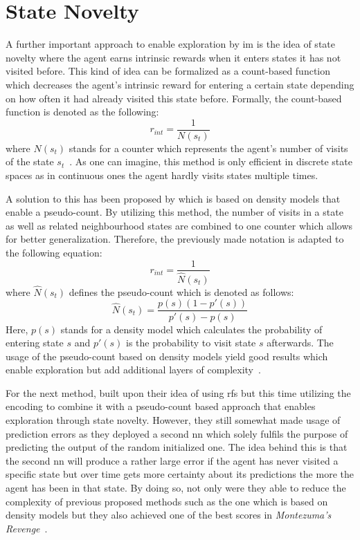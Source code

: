 \documentclass[draft,final]{vutinfth} %
\begin{document}
    \section{State Novelty}\label{sec:state-novelty}

    A further important approach to enable exploration by \gls{im} is the idea of state novelty where the agent earns intrinsic rewards when it enters states it has not visited before.
    This kind of idea can be formalized as a count-based function which decreases the agent's intrinsic reward for entering a certain state depending on how often it had already visited this state before.
    Formally, the count-based function is denoted as the following:
    \begin{equation}
        r_{int}=\frac{1}{N(s_t)}
    \end{equation}
    where $N(s_t)$ stands for a counter which represents the agent's number of visits of the state $s_t$~\citep{aubret_survey_2019}.
    As one can imagine, this method is only efficient in discrete state spaces as in continuous ones the agent hardly visits states multiple times.

    A solution to this has been proposed by \citeauthor{bellemare_unifying_2016} which is based on density models that enable a pseudo-count.
    By utilizing this method, the number of visits in a state as well as related neighbourhood states are combined to one counter which allows for better generalization.
    Therefore, the previously made notation is adapted to the following equation:
    \begin{equation}
        r_{int}=\frac{1}{\hat{N}(s_t)}
    \end{equation}
    where $\hat{N}(s_t)$ defines the pseudo-count which is denoted as follows:
    \begin{equation}
        \hat{N}(s_t)=\frac{p(s)(1-p'(s))}{p'(s)-p(s)}
    \end{equation}
    Here, $p(s)$ stands for a density model which calculates the probability of entering state $s$ and $p'(s)$ is the probability to visit state $s$ afterwards.
    The usage of the pseudo-count based on density models yield good results which enable exploration but add additional layers of complexity~\citep{aubret_survey_2019}.

    For the next method, \citet{burda_exploration_2018} built upon their idea of using \glspl{rf} but this time utilizing the encoding to combine it with a pseudo-count based approach that enables exploration through state novelty.
    However, they still somewhat made usage of prediction errors as they deployed a second \gls{nn} which solely fulfils the purpose of predicting the output of the random initialized one.
    The idea behind this is that the second \gls{nn} will produce a rather large error if the agent has never visited a specific state but over time gets more certainty about its predictions the more the agent has been in that state.
    By doing so, not only were they able to reduce the complexity of previous proposed methods such as the one which is based on density models but they also achieved one of the best scores in \textit{Montezuma's Revenge}~\citep{ecoffet_go-explore_2019}.
\end{document}

